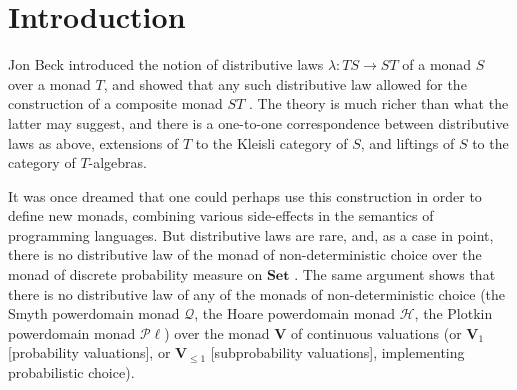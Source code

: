 \documentclass[preprint,12pt]{elsarticle}
\newcommand\Smyth{{\mathcal Q}}
\newcommand\Hoare{{\mathcal H}}
\newcommand\Plotkin{\mathcal P\ell} %
\newcommand\Val{{\mathbf V}}
\newcommand\Setcat{\mathbf{Set}}
\begin{document}

\section{Introduction}
\label{sec:introduction}

Jon Beck introduced the notion of distributive laws
$\lambda \colon TS \to ST$ of a monad $S$ over a monad $T$, and showed
that any such distributive law allowed for the construction of a
composite monad $ST$ \cite{Beck:distr}.  The theory is much richer
than what the latter may suggest, and there is a one-to-one
correspondence between distributive laws as above, extensions of $T$
to the Kleisli category of $S$, and liftings of $S$ to the category of
$T$-algebras.

It was once dreamed that one could perhaps use this construction in
order to define new monads, combining various side-effects in the
semantics of programming languages.  But distributive laws are rare,
and, as a case in point, there is no distributive law of the monad of
non-deterministic choice over the monad of discrete probability
measure on $\Setcat$ \cite{VW:distr}.  The same argument shows that
there is no distributive law of any of the monads of non-deterministic
choice (the Smyth powerdomain monad $\Smyth$, the Hoare powerdomain
monad $\Hoare$, the Plotkin powerdomain monad $\Plotkin$) over the
monad $\Val$ of continuous valuations (or $\Val_1$ [probability
valuations], or $\Val_{\leq 1}$ [subprobability valuations],
implementing probabilistic choice).
\end{document}
